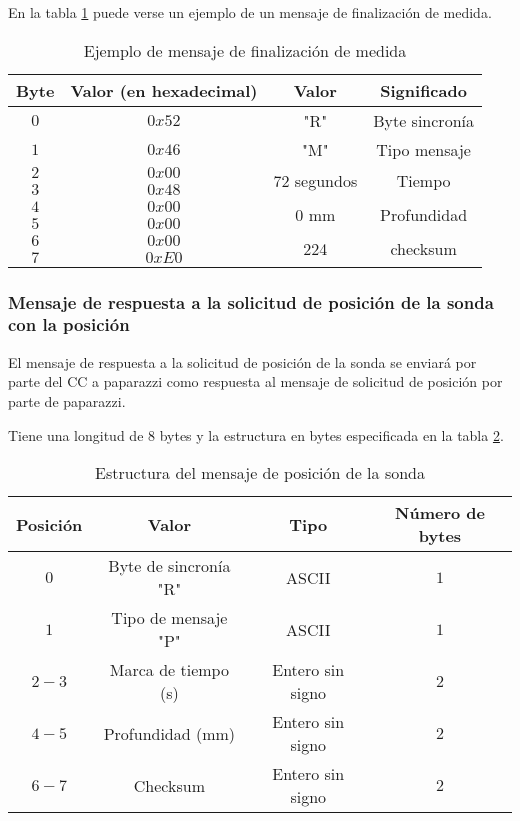 En la tabla \ref{tab13} puede verse un ejemplo de un mensaje de finalización de medida.

\begin{table}[h]
	\centering
	\caption{Ejemplo de mensaje de finalización de medida}
	\begin{tabular}{|c|c|c|c|}\hline
		\textbf{Byte} 	&	\textbf{Valor (en hexadecimal)}	&\textbf{Valor}	&\textbf{Significado} \\ \hline \hline
		$0$ 			&  $0x52$			& "R"	& Byte sincronía	\\ \hline
		$1$				&  $0x46$			& "M"	& Tipo mensaje		\\ \hline
		$2$				&  $0x00$			& \multirow{2}{*}{$72$ segundos} & \multirow{2}{*}{Tiempo} \\
		$3$				&  $0x48$			&  & \\ \hline	
		$4$				&  $0x00$			& \multirow{2}{*}{$0$ mm} & \multirow{2}{*}{Profundidad} \\
		$5$				&  $0x00$			&  & \\ \hline	
		$6$				&  $0x00$			&  \multirow{2}{*}{224}	& \multirow{2}{*}{checksum} \\
		$7$				&  $0xE0$			&     &     \\ \hline	
		
		
	\end{tabular}
	\label{tab13}
\end{table}

\subsubsection{Mensaje de respuesta a la solicitud de posición de la sonda con la posición}

El mensaje de respuesta a la solicitud de posición de la sonda se enviará por parte del CC a paparazzi como respuesta al mensaje de solicitud de posición por parte de paparazzi.

Tiene una longitud de $8$ bytes y la estructura en bytes especificada en la tabla \ref{tab14}.

\begin{table}[h]
	\centering
	\caption{Estructura del mensaje de posición de la sonda}
	\begin{tabular}{|c|c|c|c|}\hline 
		\textbf{Posición}	& \textbf{Valor} & \textbf{Tipo} &\textbf{Número de bytes} \\ \hline \hline 
		$0$		& Byte de sincronía "R"				& ASCII	 			&	$1$ \\  \hline
		$1$		& Tipo de mensaje "P"				& ASCII	 			&	$1$ \\  \hline
		$2-3$	& Marca de tiempo (s)				& Entero sin signo	&   $2$ \\  \hline
		$4-5$	& Profundidad (mm)  				& Entero sin signo	&   $2$ \\  \hline
		$6-7$	& Checksum 							& Entero sin signo	&   $2$ \\  \hline
	\end{tabular}
	\label{tab14}
\end{table}

